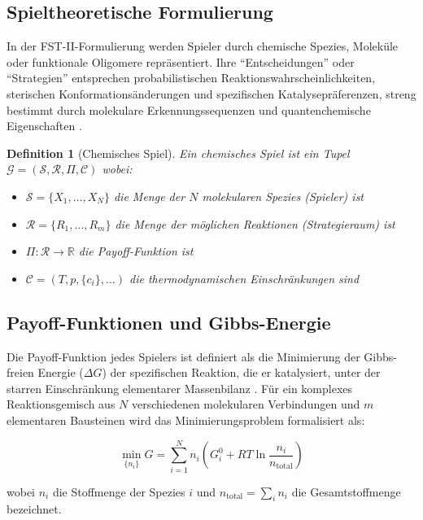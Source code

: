 \documentclass[12pt,a4paper]{article}
\newtheorem{definition}{Definition}
\theoremstyle{remark}
\begin{document}
\subsection{Spieltheoretische Formulierung}

In der FST-II-Formulierung werden Spieler durch chemische Spezies, Molek\"ule oder funktionale Oligomere repr\"asentiert. Ihre ``Entscheidungen'' oder ``Strategien'' entsprechen probabilistischen Reaktionswahrscheinlichkeiten, sterischen Konformations\"anderungen und spezifischen Katalysepr\"aferenzen, streng bestimmt durch molekulare Erkennungssequenzen und quantenchemische Eigenschaften \citep{ThermodynamicSelection}.

\begin{definition}[Chemisches Spiel]
Ein chemisches Spiel ist ein Tupel $\mathcal{G} = (\mathcal{S}, \mathcal{R}, \Pi, \mathcal{C})$ wobei:
\begin{itemize}
    \item $\mathcal{S} = \{X_1, \ldots, X_N\}$ die Menge der $N$ molekularen Spezies (Spieler) ist
    \item $\mathcal{R} = \{R_1, \ldots, R_m\}$ die Menge der m\"oglichen Reaktionen (Strategieraum) ist
    \item $\Pi: \mathcal{R} \to \mathbb{R}$ die Payoff-Funktion ist
    \item $\mathcal{C} = (T, p, \{c_i\}, \ldots)$ die thermodynamischen Einschr\"ankungen sind
\end{itemize}
\end{definition}

\subsection{Payoff-Funktionen und Gibbs-Energie}

Die Payoff-Funktion jedes Spielers ist definiert als die Minimierung der Gibbs-freien Energie ($\Delta G$) der spezifischen Reaktion, die er katalysiert, unter der starren Einschr\"ankung elementarer Massenbilanz \citep{MetabolicNash}. F\"ur ein komplexes Reaktionsgemisch aus $N$ verschiedenen molekularen Verbindungen und $m$ elementaren Bausteinen wird das Minimierungsproblem formalisiert als:

\begin{equation}
\min_{\{n_i\}} G = \sum_{i=1}^{N} n_i \left( G_i^0 + RT \ln\frac{n_i}{n_{\mathrm{total}}} \right)
\end{equation}

\noindent
wobei $n_i$ die Stoffmenge der Spezies $i$ und $n_{\mathrm{total}} = \sum_i n_i$ die Gesamtstoffmenge bezeichnet.
\end{document}
